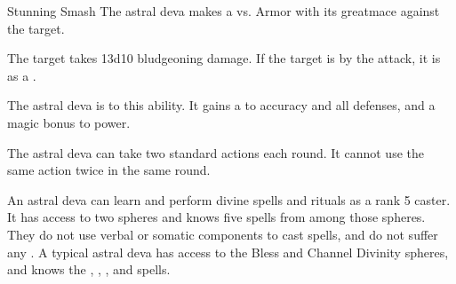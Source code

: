     \begin{freeability}{Stunning Smash}
       The astral deva makes a 
         vs. Armor
        with its greatmace against the target.
    
    \hit The target takes 13d10 bludgeoning damage. If the target is  by the attack, it is  as a .
    \end{freeability}
  
      
              The astral deva is  to this ability.
              It gains a   to accuracy and all defenses, and a  magic bonus to power.
            
              The astral deva can take two standard actions each round.
              It cannot use the same action twice in the same round.
            
              An astral deva can learn and perform divine spells and rituals as a rank 5 caster.
              It has access to two spheres and knows five spells from among those spheres.
              They do not use verbal or somatic components to cast spells, and do not suffer any .
              A typical astral deva has access to the Bless and Channel Divinity spheres, and knows the , , ,  and  spells.
            
